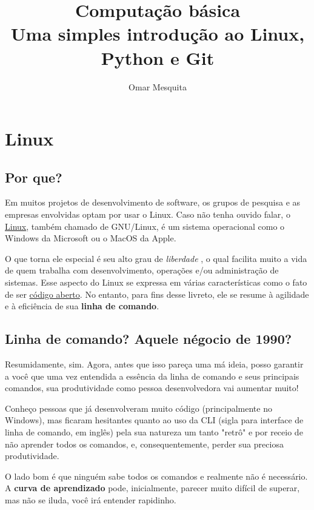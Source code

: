 \documentclass{article}
\begin{document}
	\title {Computação básica \\[1ex] \large Uma simples introdução ao Linux, Python e Git}
	\date{}
	\author{Omar Mesquita}
	\maketitle
	
	\newpage
	\tableofcontents


	\newpage
	\section{Linux}
	\subsection{Por que?}
	
	Em muitos projetos de desenvolvimento de software, os grupos de pesquisa e as empresas envolvidas optam por  
	usar o Linux. Caso não tenha ouvido falar, o \href{https://pt.wikipedia.org/wiki/Linux}{Linux}, também chamado de GNU/Linux, é um sistema operacional como o 
	Windows da Microsoft ou o MacOS da Apple. 


	O que torna ele especial é seu alto grau de \textit{liberdade} , o qual facilita muito a vida de quem trabalha com 
	desenvolvimento, operações e/ou administração de sistemas. Esse aspecto do Linux se expressa em várias características 
	como o fato de ser \href{https://pt.wikipedia.org/wiki/C%C3%B3digo_aberto}{código aberto}. No entanto, para fins desse livreto, ele se resume à agilidade
	e à eficiência de sua \textbf{linha de comando}.

	\subsection{Linha de comando? Aquele négocio de 1990?} 

	Resumidamente, sim. Agora, antes que isso pareça uma má ideia, posso garantir a você que uma vez entendida a essência da
	linha de comando e seus principais comandos, sua produtividade como pessoa desenvolvedora vai aumentar muito! 

	Conheço pessoas que já desenvolveram muito código (principalmente no Windows), 
	mas ficaram hesitantes quanto ao uso da CLI (sigla para interface de linha de comando, em inglês) 
	pela sua natureza um tanto "retrô" e por receio de não aprender todos os comandos, e,
	consequentemente, perder sua preciosa produtividade. 

	O lado bom é que ninguém sabe todos os comandos e realmente não é necessário. A \textbf{curva de aprendizado} pode, 
	inicialmente, parecer muito difícil de superar, mas não se iluda, você irá entender rapidinho. 
\end{document}
